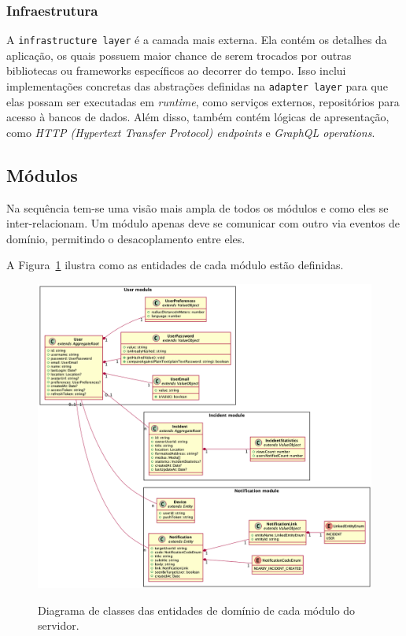 \subsubsection{Infraestrutura}

A \texttt{infrastructure layer} é a camada mais externa. Ela contém os detalhes da aplicação, os quais possuem maior chance de serem trocados por outras bibliotecas ou frameworks específicos ao decorrer do tempo. Isso inclui implementações concretas das abstrações definidas na \texttt{adapter layer} para que elas possam ser executadas em \emph{runtime}, como serviços externos, repositórios para acesso à bancos de dados. Além disso, também contém lógicas de apresentação, como \emph{HTTP (Hypertext Transfer Protocol) endpoints} e \emph{GraphQL operations}.

\subsection{Módulos}

Na sequência tem-se uma visão mais ampla de todos os módulos e como eles se inter-relacionam. Um módulo apenas deve se comunicar com outro via eventos de domínio, permitindo o desacoplamento entre eles.

A Figura~\ref{f.system_server_all-modules_domain-entities} ilustra como as entidades de cada módulo estão definidas. 

\begin{figure}[htbp]
	\caption{\small Diagrama de classes das entidades de domínio de cada módulo do servidor.}
	\centering
	\includegraphics[width=\textwidth]{../diagrams/out/system_server_all-modules_domain-entities.png}
	\label{f.system_server_all-modules_domain-entities}
\end{figure}

